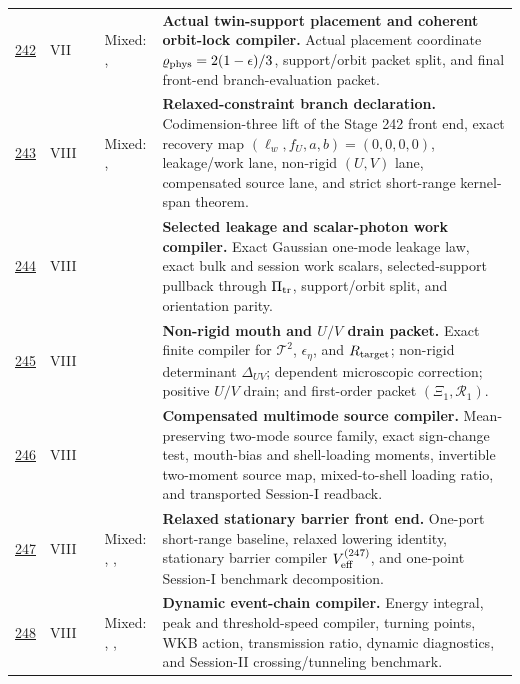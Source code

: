 {\begin{longtable}{@{}L{0.055\textwidth}L{0.075\textwidth}L{0.145\textwidth}L{0.235\textwidth}L{0.43\textwidth}@{}}
\addlinespace
\hyperref[stage:242]{242} & VII &  & Mixed: \StatusExactClosure{}, \StatusOpen{} & \textbf{Actual twin-support placement and coherent orbit-lock compiler.} Actual placement coordinate \(\varrho_{\rm phys}=2(1-\epsilon)/3\), support/orbit packet split, and final front-end branch-evaluation packet. \\
\addlinespace
\hyperref[stage:243]{243} & VIII &  & Mixed: \StatusEffective{}, \StatusExactClosure{} & \textbf{Relaxed-constraint branch declaration.} Codimension-three lift of the Stage 242 front end, exact recovery map \((\ell_w,f_U,a,b)=(0,0,0,0)\), leakage/work lane, non-rigid \((U,V)\) lane, compensated source lane, and strict short-range kernel-span theorem. \\
\addlinespace
\hyperref[stage:244]{244} & VIII &  & \StatusExactClosure{} & \textbf{Selected leakage and scalar-photon work compiler.} Exact Gaussian one-mode leakage law, exact bulk and session work scalars, selected-support pullback through \(\Pi_{\rm tr}\), support/orbit split, and orientation parity. \\
\addlinespace
\hyperref[stage:245]{245} & VIII &  & \StatusExactClosure{} & \textbf{Non-rigid mouth and \(U/V\) drain packet.} Exact finite compiler for \(\mathcal T^2\), \(\epsilon_\eta\), and \(R_{\rm target}\); non-rigid determinant \(\Delta_{UV}\); dependent microscopic correction; positive \(U/V\) drain; and first-order packet \((\Xi_1,\mathcal R_1)\). \\
\addlinespace
\hyperref[stage:246]{246} & VIII &  & \StatusExactClosure{} & \textbf{Compensated multimode source compiler.} Mean-preserving two-mode source family, exact sign-change test, mouth-bias and shell-loading moments, invertible two-moment source map, mixed-to-shell loading ratio, and transported Session-I readback. \\
\addlinespace
\hyperref[stage:247]{247} & VIII &  & Mixed: \StatusExactClosure{}, \StatusEffective{}, \StatusNumerical{} & \textbf{Relaxed stationary barrier front end.} One-port short-range baseline, relaxed lowering identity, stationary barrier compiler \(V_{\rm eff}^{(247)}\), and one-point Session-I benchmark decomposition. \\
\addlinespace
\hyperref[stage:248]{248} & VIII &  & Mixed: \StatusExactClosure{}, \StatusReduced{}, \StatusNumerical{} & \textbf{Dynamic event-chain compiler.} Energy integral, peak and threshold-speed compiler, turning points, WKB action, transmission ratio, dynamic diagnostics, and Session-II crossing/tunneling benchmark. \\

\end{longtable}}
